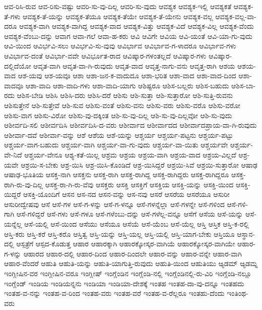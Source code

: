 {ಆವ-ರಿಸಿ-ರುವ
ಆವ-ರಿಸು-ವಷ್ಟು
ಆವರಿ-ಸು-ವು-ದಿಲ್ಲ
ಆವರಿ-ಸು-ವುದು
ಆವಶ್ಯಕ
ಆವಶ್ಯಕ-ಇಲ್ಲಿ
ಆವಶ್ಯಕತೆ
ಆವಶ್ಯಕ-ತೆ-ಗಳು
ಆವಶ್ಯಕ-ತೆ-ಯನ್ನು
ಆವಶ್ಯಕ-ತೆಯೂ
ಆವಶ್ಯಕ-ತೆಯೇ
ಆವಶ್ಯಕ-ತೆ-ಯೇನು
ಆವಶ್ಯಕ-ವಲ್ಲ
ಆವಶ್ಯಕ-ವಲ್ಲ-ವಾ-ದರೂ
ಆವಶ್ಯಕ-ವಾಗಿ
ಆವಶ್ಯಕ-ವಾಗಿದ್ದ
ಆವಶ್ಯಕ-ವಾದ
ಆವಶ್ಯಕ-ವಿತ್ತು
ಆವಶ್ಯಕ-ವಿದೆ
ಆವಶ್ಯಕ-ವಿಲ್ಲ
ಆವಶ್ಯಕ-ವೆಂದು
ಆವಶ್ಯಕ-ವೆಂಬು-ದನ್ನು
ಆವಾಗ
ಆವಾ-ಗಲೆ
ಆವಾ-ಹ-ಕರು
ಆವಿ
ಆವಿಗೇ
ಆವಿಯ
ಆವಿ-ಯಂತೆ
ಆವಿ-ಯಾ-ಗು-ವುದು
ಆವಿ-ಯಿಂದ
ಆವಿರ್ಭವಿ-ಸಲು
ಆವಿರ್ಭವಿ-ಸು-ವುವು
ಆವಿರ್ಭಾವ
ಆವಿರ್ಭಾವ-ಗ-ಳಾದರೂ
ಆವಿರ್ಭಾವ-ಗಳು
ಆವಿರ್ಭಾವ-ದಂತೆ
ಆವಿರ್ಭಾ-ವವೇ
ಆವಿರ್ಭೂತ-ರಾದ
ಆವಿಷ್ಕಾರ-ಗಳಂತಲ್ಲದೆ
ಆವಿಷ್ಕಾರ-ಗಳು
ಆವಿಷ್ಕಾರ-ದಲ್ಲಿದೆಯೋ
ಆವೃತ-ವಾಗಿ
ಆವೃತ-ವಾ-ಗಿ-ರುವುದು
ಆವೃತ-ವಾದ
ಆವೃತ್ತ-ನಾಗು-ವನು
ಆವೃತ್ತ-ರಾಗಿ
ಆಶಯ
ಆಶಯ-ವಾದ
ಆಶ-ಯವು
ಆಶ-ಯವೂ
ಆಶಾ
ಆಶಾ-ಜನ-ಕ-ವಾದುದೂ
ಆಶಾ-ಭರಿತ
ಆಶಾ-ವಾದ
ಆಶಾ-ವಾದ-ದಿಂದ
ಆಶಾ-ವಾದವೂ
ಆಶಾ-ವಾದಿ
ಆಶಾ-ವಾದಿ-ಗಳು
ಆಶಾ-ವಾದಿ-ಯಾಗು
ಆಶಿಷ್ಟರೂ
ಆಶಿಸ-ಬಲ್ಲರು
ಆಶಿಸ-ಬಹುದು
ಆಶಿಸ-ಬಾ-ರದು
ಆಶಿಸ-ಬೇಡಿ
ಆಶಿಸಿ
ಆಶಿಸಿ-ದರು
ಆಶಿಸಿ-ದರೆ
ಆಶಿಸು
ಆಶಿ-ಸುತ್ತಾ
ಆಶಿ-ಸುತ್ತಾರೋ
ಆಶಿ-ಸುತ್ತಿ-ರುವನು
ಆಶಿಸುತ್ತೇನೆ
ಆಶಿ-ಸುತ್ತೇವೆ
ಆಶಿ-ಸುವ
ಆಶಿಸು-ವಂತೆ
ಆಶಿಸು-ವನು
ಆಶಿಸು-ವರು
ಆಶಿಸು-ವರೊ
ಆಶಿಸು-ವರೋ
ಆಶಿಸು-ವಾಗ
ಆಶಿಸು-ವಿರೋ
ಆಶಿಸು-ವು-ದಕ್ಕಿಂತ
ಆಶಿ-ಸು-ವು-ದಿಲ್ಲ
ಆಶಿ-ಸು-ವು-ದಿಲ್ಲವೋ
ಆಶಿ-ಸು-ವುದು
ಆಶೀರ್ವದಿ-ಸಲಿ
ಆಶೀರ್ವದಿಸಿ
ಆಶೀರ್ವದಿಸಿ-ದ-ವರು
ಆಶೀರ್ವಾದ
ಆಶೀರ್ವಾದದ
ಆಶೀರ್ವಾದಪ್ರಾಯ-ವಾ-ಗಿ-ರುವುದು
ಆಶೀರ್ವಾ-ದವೆ
ಆಶೀರ್ವಾ-ವನ್ನು
ಆಶೆ
ಆಶೆಯ
ಆಶೆ-ಯನ್ನು
ಆಶ್ಚರ್ಯ
ಆಶ್ಚರ್ಯ-ಪಟ್ಟನು
ಆಶ್ಚರ್ಯ-ಪಟ್ಟು
ಆಶ್ಚರ್ಯ-ವಾಗ-ಬಹುದು
ಆಶ್ಚರ್ಯ-ವಾಗಿ
ಆಶ್ಚರ್ಯ-ವಾ-ಗು-ವುದು
ಆಶ್ಚರ್ಯ-ವಾ-ಯಿತು
ಆಶ್ಚರ್ಯವೇ
ಆಶ್ಚರ್ಯ-ವೇ-ನಿದೆ
ಆಶ್ಚರ್ಯ-ವೇನೂ
ಆಶ್ಯ-ಕತೆ-ಯಿಲ್ಲ
ಆಶ್ರಮ
ಆಶ್ರಯ
ಆಶ್ರಯ-ವಾಗಿ
ಆಶ್ರಯ-ವಾದ
ಆಶ್ರಯ-ವಿಲ್ಲದೆ
ಆಶ್ರ-ಯವೇ
ಆಶ್ರಯಿ-ಸ-ಬೇಕು
ಆಶ್ರ-ಯಿಸಿ
ಆಶ್ರ-ಯಿಸಿ-ಕೊಂಡಿದೆ
ಆಶ್ರ-ಯಿಸಿದ್ದರೆ
ಆಶ್ರಯಿ-ಸಿವೆ
ಆಶ್ರಯಿ-ಸುತ್ತಾರೋ
ಆಷಾಢ
ಆಷಾಢ-ಭೂತಿಯ
ಆಸಕ್ತ-ನಾಗಿ
ಆಸಕ್ತನು
ಆಸಕ್ತ-ರಾಗಿ
ಆಸಕ್ತ-ರಾಗಿದ್ದ
ಆಸಕ್ತ-ರಾಗಿದ್ದರು
ಆಸಕ್ತ-ರಾಗಿದ್ದರೂ
ಆಸಕ್ತ-ರಾಗಿ-ರು-ವು-ದಿಲ್ಲ
ಆಸಕ್ತ-ರಾ-ಗಿ-ರು-ವೆವು
ಆಸಕ್ತರು
ಆಸಕ್ತಿ
ಆಸಕ್ತಿಗೆ
ಆಸಕ್ತಿಯ
ಆಸಕ್ತಿ-ಯನ್ನು
ಆಸಕ್ತಿ-ಯಿಂದ
ಆಸಕ್ತಿ-ಯಿದ್ದರೆ
ಆಸಕ್ತಿ-ಯೊಂದಿಗೆ
ಆಸನ
ಆಸ-ನದ
ಆಸನ-ವನ್ನು
ಆಸ-ನವು
ಆಸರೆ
ಆಸರೆಯ
ಆಸರೆಯೂ
ಆಸುರೀ
ಆಸುರೀದ್ವೇಷವು
ಆಸೆ
ಆಸೆ-ಗಳ
ಆಸೆ-ಗ-ಳನ್ನು
ಆಸೆ-ಗ-ಳನ್ನೂ
ಆಸೆ-ಗಳನ್ನೆಲ್ಲಾ
ಆಸೆ-ಗಳನ್ನೇ
ಆಸೆ-ಗಳಿಂದ
ಆಸೆ-ಗಳಿ-ಗಾಗಿ
ಆಸೆ-ಗಳಿದ್ದರೆ
ಆಸೆ-ಗಳು
ಆಸೆ-ಗಳೂ
ಆಸೆ-ಗಳೆಂಬು-ದನ್ನು
ಆಸೆ-ಗಳೆಲ್ಲ-ವನ್ನೂ
ಆಸೆಗೆ
ಆಸೆಯ
ಆಸೆ-ಯನ್ನು
ಆಸೆ-ಯನ್ನೆಲ್ಲ
ಆಸೆ-ಯಲ್ಲಿ
ಆಸೆ-ಯಿಂದ
ಆಸೆಯು
ಆಸೆಯೂ
ಆಸೆಯೆ
ಆಸೆ-ಯೆಂಬ
ಆಸೆ-ಯೆಲ್ಲ
ಆಸ್ತಿ
ಆಸ್ತಿಕ
ಆಸ್ತಿ-ಕ-ರಲ್ಲಿ
ಆಸ್ತಿ-ಕರು
ಆಸ್ತಿ-ಕರೆ
ಆಸ್ತಿ-ಕರೊ
ಆಸ್ತಿತ್ವ
ಆಸ್ತಿ-ಯನ್ನು
ಆಸ್ತಿ-ಯಲ್ಲ
ಆಸ್ತಿ-ಯಲ್ಲಿ
ಆಸ್ತಿ-ಯಾಗ-ಬೇಕು
ಆಸ್ತಿಯೂ
ಆಸ್ಥಾನ-ದಲ್ಲಿ
ಆಸ್ಪತ್ರೆಗೆ
ಆಸ್ಪದ-ಕೊಡುತ್ತ
ಆಹಾರ
ಆಹಾರಕ್ಕಾಗಿ
ಆಹಾರಕ್ಕೋಸ್ಕರ-ವಾಗಿಯೆ
ಆಹಾರಕ್ಕೋಸ್ಕರ-ವಾಗಿಯೇ
ಆಹಾರ-ಗ-ಳನ್ನು
ಆಹಾರದ
ಆಹಾರ-ದಲ್ಲಿ
ಆಹಾರ-ದಿಂದ
ಆಹಾರ-ದಿಂದಲೇ
ಆಹಾರ-ವನ್ನು
ಆಹಾರ-ವನ್ನೇ
ಆಹಾರ-ವಾಗಿ
ಆಹಾರ-ವೆಂದರೆ
ಆಹುತಿ
ಆಹುತಿ-ಯನ್ನು
ಆಹುತಿ-ಯಾಗುತ್ತಿ-ರುವುದು
ಆಹುತಿ-ಯಿಂದ
ಆಹುತಿಯು
ಆ್ಯಡಮ್
ಆ್ಯಡಮ್ನ
ಇಂಗ್ಲೀಷಿನ-ವರ
ಇಂಗ್ಲೀಷಿನ-ವರೂ
ಇಂಗ್ಲೀಷ್
ಇಂಗ್ಲೆಂಡಿನ
ಇಂಗ್ಲೆಂಡಿ-ನಲ್ಲಿ
ಇಂಗ್ಲೆಂಡಿನಲ್ಲಿ-ರು-ವಿರಿ
ಇಂಗ್ಲೆಂಡಿ-ನಲ್ಲೂ
ಇಂಗ್ಲೆಂಡ್
ಇಂಡಿಯ
ಇಂಡಿಯನ್ನನು
ಇಂಡಿಯಾ
ಇಂಡಿಯಾ-ದೇಶಕ್ಕೆ
ಇಂತಹ
ಇಂತಹ-ದಾ-ವು-ದನ್ನೂ
ಇಂತಹದು
ಇಂತಹ-ವ-ನನ್ನು
ಇಂತಹ-ವ-ರಿಂದ
ಇಂತಹ-ವರು
ಇಂತಹ-ವರೆ
ಇಂತಹ-ವ-ರೆಲ್ಲರೂ
ಇಂತಹು-ದೆಂದು
ಇಂತಿಂಥ-ವರು
}
